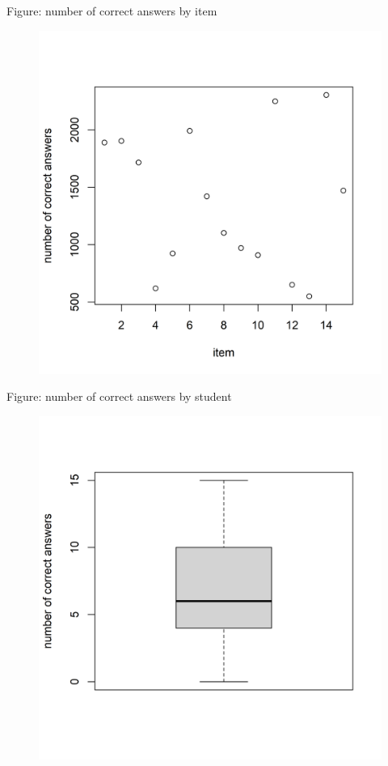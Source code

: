 \documentclass[xcolor=dvipsnames,12pt]{beamer}
\begin{document}
  \begin{frame}{Figure: number of correct answers by item}
    \begin{figure}
      \includegraphics[scale = 0.5]{figures/number_correct_by_item.png}
    \end{figure}
  \end{frame}

  \begin{frame}{Figure: number of correct answers by student}
    \begin{figure}
      \includegraphics[scale = 0.5]{figures/number_correct_by_person.png}
    \end{figure}
  \end{frame}
\end{document}
